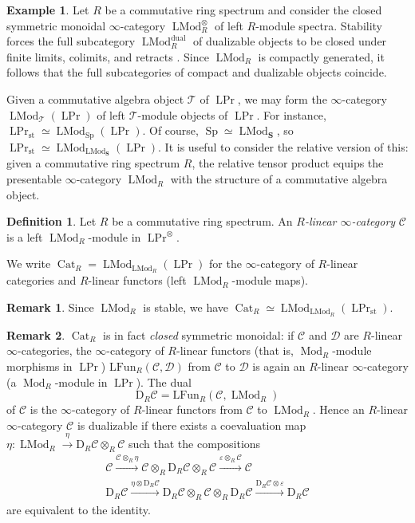 \documentclass[12pt]{article}
\theoremstyle{definition}
\newtheorem{definition}{Definition}[subsection]
\newtheorem{example}{Example}[subsection]
\newtheorem{remark}{Remark}[subsection]
\newcommand{\C}{\mathcal{C}}
\newcommand{\D}{\mathcal{D}}
\newcommand{\T}{\mathcal{T}}
\renewcommand{\SS}{\mathbf{S}}
\renewcommand{\i}{\infty}
\DeclareMathOperator{\LMod}{LMod}
\newcommand{\Dual}{\mathrm{D}}
\DeclareMathOperator{\Mod}{Mod}
\DeclareMathOperator{\Cat}{Cat}
\newcommand{\Funl}{\mathrm{LFun}}
\DeclareMathOperator{\Prl}{LPr}
\DeclareMathOperator{\Sp}{Sp}
\newcommand{\st}{\mathrm{st}}
\renewcommand{\epsilon}{\varepsilon}
\begin{document}
\begin{example}
Let $R$ be a commutative ring spectrum and consider the closed symmetric monoidal $\i$-category $\LMod_R^\otimes$ of left $R$-module spectra.
Stability forces the full subcategory $\LMod_R^{\mathrm{dual}}$ of dualizable objects to be closed under finite limits, colimits, and retracts \cite[Theorem 2.1.3]{HPS}.
Since $\LMod_R$ is compactly generated, it follows that the full subcategories of compact and dualizable objects coincide.
\end{example}

Given a commutative algebra object $\T$ of $\Prl$, we may form the $\i$-category $\LMod_{\T}(\Prl)$ of left $\T$-module objects of $\Prl$. For instance, $\Prl_\st\simeq\LMod_{\Sp}(\Prl)$.
Of course, $\Sp\simeq\LMod_\SS$, so $\Prl_\st\simeq\LMod_{\LMod_\SS}(\Prl)$.
It is useful to consider the relative version of this: given a commutative ring spectrum $R$, the relative tensor product equips the presentable $\i$-category $\LMod_R$ with the structure of a commutative algebra object.
\begin{definition}
Let $R$ be a commutative ring spectrum.
An {\em $R$-linear $\i$-category} $\C$ is a left $\LMod_R$-module in $\Prl^\otimes$.
\end{definition}
We write $\Cat_R=\LMod_{\LMod_R}(\Prl)$
for the $\i$-category of $R$-linear categories and $R$-linear functors (left $\LMod_R$-module maps).
\begin{remark}
Since $\LMod_R$ is stable, we have
$\Cat_R\simeq\LMod_{\LMod_R}(\Prl_{\st})$.
\end{remark}

\begin{remark}
$\Cat_R$ is in fact {\em closed} symmetric monoidal: if $\C$ and $\D$ are $R$-linear $\i$-categories, the $\i$-category of $R$-linear functors (that is, $\Mod_R$-module morphisms in $\Prl$)
$
\Funl_R(\C,\D)
$
from $\C$ to $\D$ is again an $R$-linear $\i$-category (a $\Mod_R$-module in $\Prl$).
The dual
\begin{equation*}
    \mathrm{D}_R\C=\Funl_R(\C,\LMod_R)
\end{equation*}
of $\C$ is the $\i$-category of $R$-linear functors from $\C$ to $\LMod_R$.
Hence an $R$-linear $\i$-category $\C$ is dualizable if there exists a coevaluation map $\eta: \LMod_R\xrightarrow{\eta}\Dual_R\C\otimes_R\C$ such that the compositions
\begin{gather*}
\C\xrightarrow{\C\otimes_R\eta}\C\otimes_R\Dual_R\C\otimes_R\C\xrightarrow{\epsilon\otimes_R\C}\C\\
\Dual_R\C\xrightarrow{\eta\otimes\Dual_R\C}\Dual_R\C\otimes_R\C\otimes_R\Dual_R\C\xrightarrow{\Dual_R\C\otimes\epsilon}\Dual_R\C
\end{gather*}
are equivalent to the identity.
\end{remark}
\end{document}
